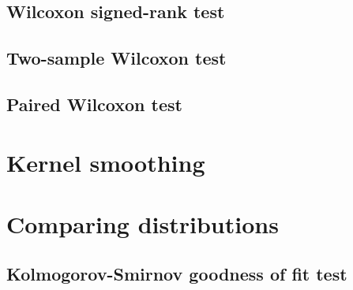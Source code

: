 \subsection{Wilcoxon signed-rank test}
\subsection{Two-sample Wilcoxon test}
\subsection{Paired Wilcoxon test}

\section{Kernel smoothing}

\section{Comparing distributions}
\subsection{Kolmogorov-Smirnov goodness of fit test}